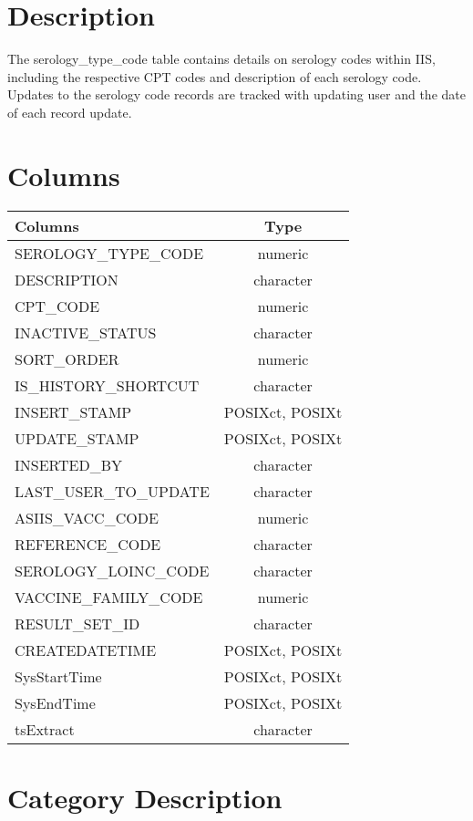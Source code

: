\documentclass[
  letterpaper,
  DIV=11,
  numbers=noendperiod]{scrreprt}
\begin{document}
\hypertarget{description-39}{%
\section*{Description}\label{description-39}}

The serology\_type\_code table contains details on serology codes within
IIS, including the respective CPT codes and description of each serology
code. Updates to the serology code records are tracked with updating
user and the date of each record update.

\hypertarget{columns-39}{%
\section*{Columns}\label{columns-39}}

\begin{longtable}{lc}
\toprule
Columns & Type \\ 
\midrule
SEROLOGY\_TYPE\_CODE & numeric \\ 
DESCRIPTION & character \\ 
CPT\_CODE & numeric \\ 
INACTIVE\_STATUS & character \\ 
SORT\_ORDER & numeric \\ 
IS\_HISTORY\_SHORTCUT & character \\ 
INSERT\_STAMP & POSIXct, POSIXt \\ 
UPDATE\_STAMP & POSIXct, POSIXt \\ 
INSERTED\_BY & character \\ 
LAST\_USER\_TO\_UPDATE & character \\ 
ASIIS\_VACC\_CODE & numeric \\ 
REFERENCE\_CODE & character \\ 
SEROLOGY\_LOINC\_CODE & character \\ 
VACCINE\_FAMILY\_CODE & numeric \\ 
RESULT\_SET\_ID & character \\ 
CREATEDATETIME & POSIXct, POSIXt \\ 
SysStartTime & POSIXct, POSIXt \\ 
SysEndTime & POSIXct, POSIXt \\ 
tsExtract & character \\ 
\bottomrule
\end{longtable}

\hypertarget{category-description-39}{%
\section*{Category Description}\label{category-description-39}}
\end{document}
